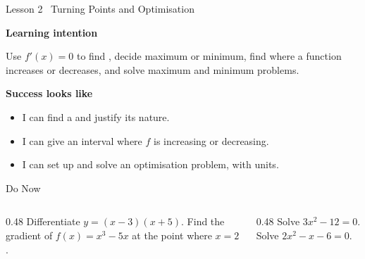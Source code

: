 \documentclass[aspectratio=169,11pt,t,xcolor=table]{beamer}
\begin{document}
\begin{frame}{Lesson 2 \textperiodcentered\ Turning Points and Optimisation}\relax
\vskip6mm
{\sEmph\bfseries Learning intention\par}\vskip2mm
Use $f'(x)=0$ to find \tturns, decide maximum or minimum, find where a function increases or decreases, and solve maximum and minimum problems.
\vskip6mm
{\sEmph\bfseries Success looks like\par}\vskip2mm
\begin{itemize}
\item I can find a \tturn and justify its nature.
\item I can give an interval where $f$ is increasing or decreasing.
\item I can set up and solve an optimisation problem, with units.
\end{itemize}
\end{frame}

\begin{frame}{Do Now}\relax
\begin{columns}[T]
\begin{column}{0.48\textwidth}
 Differentiate $y=(x-3)(x+5)$.
\vskip5mm
 Find the gradient of $f(x)=x^{3}-5x$ at the point where $x=2$.
\end{column}
\begin{column}{0.48\textwidth}
 Solve $3x^{2}-12=0$.
\vskip5mm
 Solve $2x^{2}-x-6=0$.
\end{column}
\end{columns}
\end{frame}
\end{document}

